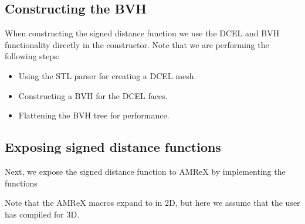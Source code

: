 \documentclass[letterpaper,10pt,english]{sphinxmanual}
\begin{document}
\begin{sphinxVerbatim}[commandchars=\\\{\}]
         

\end{sphinxVerbatim}


\subsection{Constructing the BVH}
\label{\detokenize{Example_AMReX:constructing-the-bvh}}
\sphinxAtStartPar
When constructing the signed distance function we use the DCEL and BVH functionality directly in the constructor.
Note that we are performing the following steps:
\begin{itemize}
\item {} 
\sphinxAtStartPar
Using the STL parser for creating a DCEL mesh.

\item {} 
\sphinxAtStartPar
Constructing a BVH for the DCEL faces.

\item {} 
\sphinxAtStartPar
Flattening the BVH tree for performance.

\end{itemize}


\subsection{Exposing signed distance functions}
\label{\detokenize{Example_AMReX:exposing-signed-distance-functions}}
\sphinxAtStartPar
Next, we expose the signed distance function to AMReX by implementing the functions

\begin{sphinxVerbatim}[commandchars=\\\{\}]
        
\end{sphinxVerbatim}

\sphinxAtStartPar
Note that the AMReX  macros expand to  in 2D, but here we assume that the user has compiled for 3D.
\end{document}
